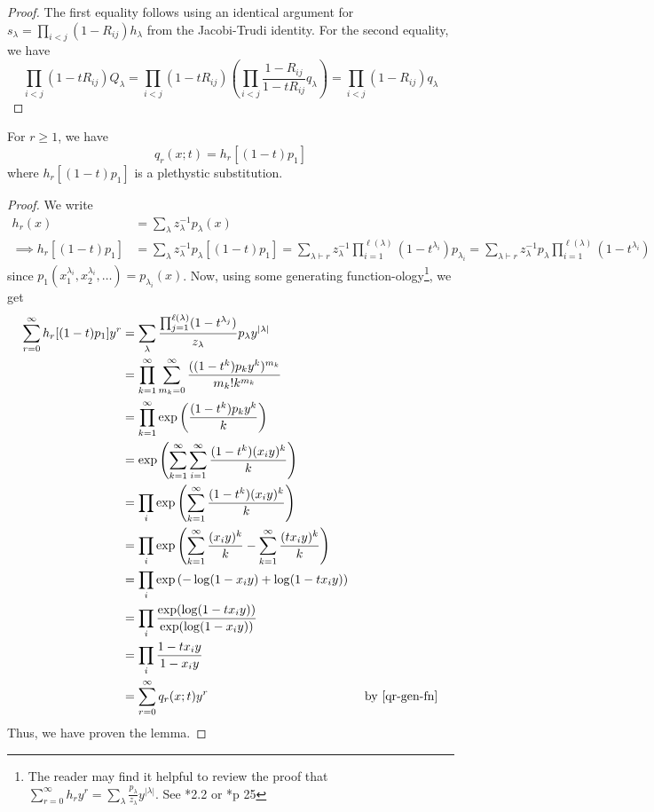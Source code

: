 \documentclass[11pt,leqno,oneside]{amsart}
\numberwithin{thm}{section}
\newcommand{\partitionof}{\vdash}
\newcommand{\exp}{\operatorname{exp}}
\begin{document}
\begin{proof}
  The first equality follows using an identical argument for
  \(s_\lambda = \prod_{i<j}(1-R_{ij}) h_\lambda\) from the
  Jacobi-Trudi identity. For the second equality, we have \[
    \prod_{i < j} (1-tR_{ij})Q_\lambda = \prod_{i <
      j}(1-tR_{ij})\left( \prod_{i<j} \frac{1-R_{ij}}{1-tR_{ij}}
      q_\lambda \right) = \prod_{i < j} (1-R_{ij}) q_\lambda
  \]
\end{proof}
\begin{lem}
  For \(r \geq 1\), we have \[
    q_r(x;t) = h_r[(1-t)p_{1}]
  \]
  where \(h_r[(1-t)p_{1}]\) is a plethystic substitution.
\end{lem}
\begin{proof}
  We write
  \begin{align*}
    h_r(x) & = \sum_{\lambda} z_\lambda^{-1} p_\lambda(x) \\
    \implies
    h_r[(1-t)p_1] & = \sum_{\lambda} z_\lambda^{-1} p_\lambda[(1-t)p_1]
    = \sum_{\lambda \partitionof r} z_\lambda^{-1}
    \prod_{i=1}^{\ell(\lambda)} (1-t^{\lambda_i}) p_{\lambda_i} 
    = \sum_{\lambda \partitionof r} z_\lambda^{-1} p_\lambda \prod_{i=1}^{\ell(\lambda)}(1-t^{\lambda_i})
  \end{align*}
  since \(p_1(x_1^{\lambda_i}, x_2^{\lambda_i}, \ldots) =
  p_{\lambda_i}(x)\).
  Now, using some generating function-ology\footnote{The reader may
    find it helpful to review the proof that \(\sum_{r=0}^\infty h_r
    y^r = \sum_\lambda \frac{p_\lambda}{z_\lambda}
    y^{|\lambda|}\). See \cite{alg-comb}*{2.2} or \cite{macdonald}*{p 25}}, we get
  \begin{align*}
    \sum_{r=0}^\infty h_r[(1-t)p_1] y^r
    & = \sum_\lambda
      \frac{\prod_{j=1}^{\ell(\lambda)} (1-t^{\lambda_j})}{z_\lambda} p_\lambda
      y^{|\lambda|} \\
    & = \prod_{k=1}^\infty\sum_{m_k=0}^\infty \frac{((1-t^k) p_k
      y^k)^{m_k}}{m_k! k^{m_k}}\\
    & = \prod_{k=1}^\infty \exp\left( \frac{(1-t^k)p_k y^k}{k}
      \right)\\
    & = \exp \left( \sum_{k=1}^\infty \sum_{i=1}^\infty
      \frac{(1-t^k)(x_i y)^k}{k} \right)\\
    & = \prod_i \exp\left( \sum_{k=1}^\infty \frac{(1-t^k)(x_i
      y)^k}{k} \right)\\
    & = \prod_i \exp\left( \sum_{k=1}^\infty \frac{(x_i y)^k}{k} -
      \sum_{k=1}^\infty \frac{(t x_i y)^k}{k} \right) \\
    & = \prod_i \exp\left( -\log(1-x_i y) + \log(1 - t x_i y) \right)
    \\
    & = \prod_i \frac{\exp(\log(1-tx_i y))}{\exp(\log(1- x_i y))} \\
    & = \prod_i \frac{1-t x_i y}{1 - x_i y} \\
    & = \sum_{r=0}^\infty q_r(x;t) y^r & \text{ by \ref{qr-gen-fn}}
  \end{align*}
  Thus, we have proven the lemma.
\end{proof}
\end{document}

